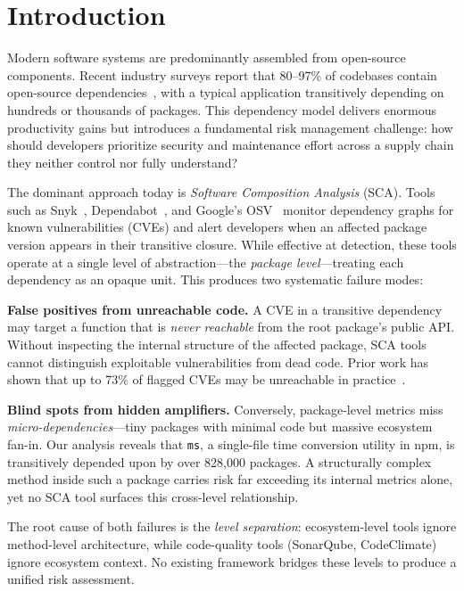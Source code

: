 \documentclass[conference]{IEEEtran}
\begin{document}
\section{Introduction}
\label{sec:introduction}

Modern software systems are predominantly assembled from open-source components. Recent industry surveys report that 80--97\% of codebases contain open-source dependencies~\cite{synopsys2024}, with a typical application transitively depending on hundreds or thousands of packages. This dependency model delivers enormous productivity gains but introduces a fundamental risk management challenge: how should developers prioritize security and maintenance effort across a supply chain they neither control nor fully understand?

The dominant approach today is \emph{Software Composition Analysis} (SCA). Tools such as Snyk~\cite{snyk2024}, Dependabot~\cite{dependabot}, and Google's OSV~\cite{osv} monitor dependency graphs for known vulnerabilities (CVEs) and alert developers when an affected package version appears in their transitive closure. While effective at detection, these tools operate at a single level of abstraction---the \emph{package level}---treating each dependency as an opaque unit. This produces two systematic failure modes:

\textbf{False positives from unreachable code.} A CVE in a transitive dependency may target a function that is \emph{never reachable} from the root package's public API. Without inspecting the internal structure of the affected package, SCA tools cannot distinguish exploitable vulnerabilities from dead code. Prior work has shown that up to 73\% of flagged CVEs may be unreachable in practice~\cite{pashchenko2020vuln4real}.

\textbf{Blind spots from hidden amplifiers.} Conversely, package-level metrics miss \emph{micro-dependencies}---tiny packages with minimal code but massive ecosystem fan-in. Our analysis reveals that \texttt{ms}, a single-file time conversion utility in npm, is transitively depended upon by over 828,000 packages. A structurally complex method inside such a package carries risk far exceeding its internal metrics alone, yet no SCA tool surfaces this cross-level relationship.

The root cause of both failures is the \emph{level separation}: ecosystem-level tools ignore method-level architecture, while code-quality tools (SonarQube, CodeClimate) ignore ecosystem context. No existing framework bridges these levels to produce a unified risk assessment.
\end{document}
